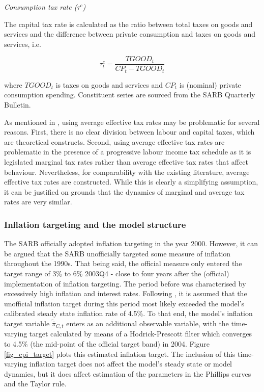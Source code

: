 \documentclass[a4paper,11pt]{article}
\numberwithin{equation}{section}
\begin{document}
	\textit{Consumption tax rate ($\tau^c$)}
	
	The capital tax rate is calculated as the ratio between total taxes on goods and services and the difference between private consumption and taxes on goods and services, i.e.
	
	\begin{equation}
	\tau^c_t = \frac{TGOOD_t}{CP_t-TGOOD_t}
	\end{equation}
	
	where $TGOOD_t$ is taxes on goods and services and $CP_t$ is (nominal) private consumption spending. Constituent series are sourced from the SARB Quarterly Bulletin.
	
	As mentioned in \cite{born2013}, using average effective tax rates may be problematic for several reasons. First, there is no clear division between labour and capital taxes, which are theoretical constructs. Second, using average effective tax rates are problematic in the presence of a progressive labour income tax schedule as it is legislated marginal tax rates rather than average effective tax rates that affect behaviour. Nevertheless, for comparability with the existing literature, average effective tax rates are constructed. While	this is clearly a simplifying assumption, it can be justified on grounds that the dynamics of marginal and average tax rates are very similar.
	
	\subsubsection{Inflation targeting and the model structure} \label{infl_targ}
	
	The SARB officially adopted inflation targeting in the year 2000. However, it can be argued that the SARB unofficially targeted some measure of inflation throughout the 1990s. That being said, the official measure only entered the target range of 3\% to 6\% 2003Q4 - close to four years after the (official) implementation of inflation targeting. The period before was characterised by excessively high inflation and interest rates. Following \cite{steinbach2014}, it is assumed that the unofficial inflation target during this period most likely exceeded the model's calibrated steady state inflation rate of 4.5\%. To that end, the model's inflation target variable $\tilde{\bar{\pi}}_{C,t}$ enters as an additional observable variable, with the time-varying target calculated by means of a Hodrick-Prescott filter which converges to 4.5\% (the mid-point of the official target band) in 2004. Figure \ref{fig_cpi_target} plots this estimated inflation target. The inclusion of this time-varying inflation target does not affect the model's steady state or model dynamics, but it does affect estimation of the parameters in the Phillips curves and the Taylor rule.
	
\end{document}
